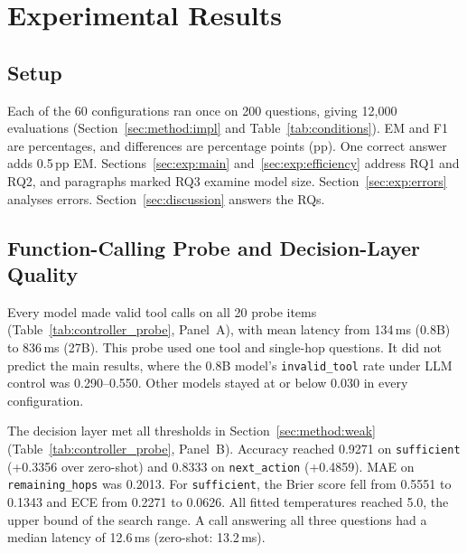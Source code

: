 \section{Experimental Results}
\label{sec:experiments}

\subsection{Setup}
\label{sec:exp:setup}

Each of the 60 configurations ran once on 200 questions, giving 12{,}000 evaluations
(Section~\ref{sec:method:impl} and Table~\ref{tab:conditions}). EM and F1 are
percentages, and differences are percentage points (pp). One correct answer adds
0.5\,pp EM. Sections~\ref{sec:exp:main} and~\ref{sec:exp:efficiency} address RQ1
and RQ2, and paragraphs marked RQ3 examine model size. Section~\ref{sec:exp:errors}
analyses errors. Section~\ref{sec:discussion} answers the RQs.

\subsection{Function-Calling Probe and Decision-Layer Quality}
\label{sec:exp:laya}

Every model made valid tool calls on all 20 probe items
(Table~\ref{tab:controller_probe}, Panel~A), with mean latency from 134\,ms (0.8B)
to 836\,ms (27B). This probe used one tool and single-hop questions. It did not predict
the main results, where the 0.8B model's \texttt{invalid\_tool} rate under LLM control
was 0.290--0.550. Other models stayed at or below 0.030 in every configuration.

The decision layer met all thresholds in Section~\ref{sec:method:weak}
(Table~\ref{tab:controller_probe}, Panel~B). Accuracy reached 0.9271 on
\texttt{sufficient} (+0.3356 over zero-shot) and 0.8333 on \texttt{next\_action}
(+0.4859). MAE on \texttt{remaining\_hops} was 0.2013. For \texttt{sufficient}, the
Brier score fell from 0.5551 to 0.1343 and ECE from 0.2271 to 0.0626. All fitted
temperatures reached 5.0, the upper bound of the search range. A call answering all three
questions had a median latency of 12.6\,ms (zero-shot: 13.2\,ms).

